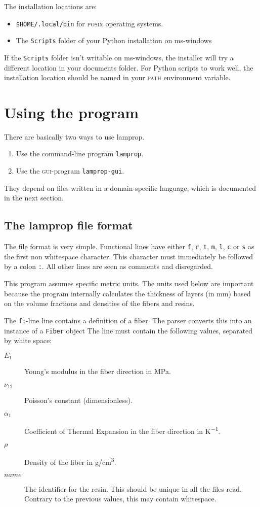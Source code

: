 \documentclass[a4paper,landscape,oneside,11pt,twocolumn]{memoir}
\begin{document}
The installation locations are:
\begin{itemize}
    \item \verb|$HOME/.local/bin| for \textsc{posix} operating systems.
    \item The \verb|Scripts| folder of your Python installation on
        ms-windows
\end{itemize}
If the \verb|Scripts| folder isn't writable on ms-windows, the installer will
try a different location in your documents folder.
For Python scripts to work well, the installation location should be named in
your \textsc{path} environment variable.


\chapter{Using the program} %

There are basically two ways to use lamprop.

\begin{enumerate}
    \item Use the command-line program \texttt{lamprop}.
    \item Use the \textsc{gui}-program \texttt{lamprop-gui}.
\end{enumerate}

They depend on files written in a domain-specific language, which is
documented in the next section.

\section{The lamprop file format} %

The file format is very simple. Functional lines have either \texttt{f},
\texttt{r}, \texttt{t}, \texttt{m}, \texttt{l}, \texttt{c} or \texttt{s} as
the first non whitespace character. This character must immediately be
followed by a colon \texttt{:}. All other lines are seen as comments and
disregarded.

This program assumes specific metric units. The units used below are important
because the program internally calculates the thickness of layers (in mm)
based on the volume fractions and densities of the fibers and resins.

The \texttt{f:}-line line contains a definition of a fiber. The parser
converts this into an instance of a \texttt{Fiber} object The line must
contain the following values, separated by white space:
\begin{description}
    \item[$E_1$] Young's modulus in the fiber direction in \si{MPa}.
    \item[$\nu_{12}$] Poisson's constant (dimensionless).
    \item[$\alpha_1$] Coefficient of Thermal Expansion in the fiber direction
        in \si{K^{-1}}.
    \item[$\rho$] Density of the fiber in \si{g/cm^3}.
    \item[$name$] The identifier for the resin. This should be unique in all
        the files read. Contrary to the previous values, this may contain
        whitespace.
\end{description}
\end{document}
